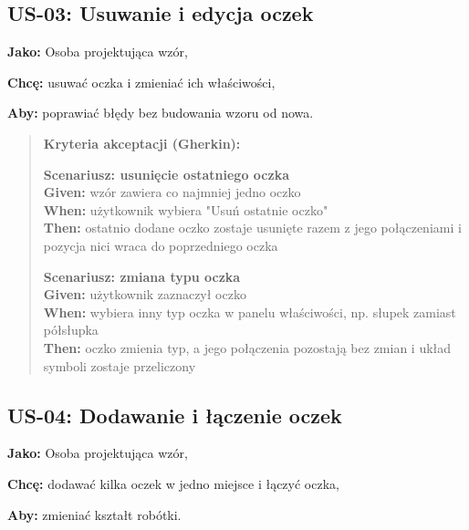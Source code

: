 \documentclass[a4paper,11pt]{article}
\begin{document}
\subsection*{\textbf{US-03: Usuwanie i edycja oczek}}

\noindent\textbf{Jako:} Osoba projektująca wzór,\par
\noindent\textbf{Chcę:} usuwać oczka i zmieniać ich właściwości,\par
\noindent\textbf{Aby:} poprawiać błędy bez budowania wzoru od nowa.\par

\begin{quote}
\textbf{Kryteria akceptacji (Gherkin):}

\textbf{Scenariusz: usunięcie ostatniego oczka} \\
\textbf{Given:} wzór zawiera co najmniej jedno oczko \\
\textbf{When:} użytkownik wybiera "Usuń ostatnie oczko" \\
\textbf{Then:} ostatnio dodane oczko zostaje usunięte razem z jego połączeniami i pozycja nici wraca do poprzedniego oczka

\textbf{Scenariusz: zmiana typu oczka} \\
\textbf{Given:} użytkownik zaznaczył oczko \\
\textbf{When:} wybiera inny typ oczka w panelu właściwości, np. słupek zamiast półsłupka \\
\textbf{Then:} oczko zmienia typ, a jego połączenia pozostają bez zmian i układ symboli zostaje przeliczony
\end{quote}

\subsection*{\textbf{US-04: Dodawanie i łączenie oczek}}

\noindent\textbf{Jako:} Osoba projektująca wzór,\par
\noindent\textbf{Chcę:} dodawać kilka oczek w jedno miejsce i łączyć oczka,\par
\noindent\textbf{Aby:} zmieniać kształt robótki.\par
\end{document}
